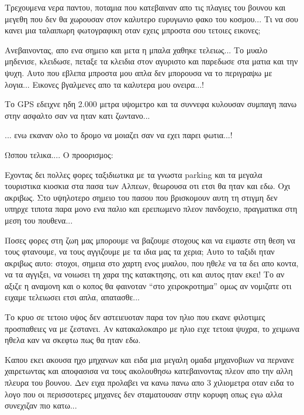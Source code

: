 
Τρεχουμενα νερα παντου, ποταμια που κατεβαιναν απο τις πλαγιες του βουνου και μεγεθη που δεν θα χωρουσαν στον καλυτερο ευρυγωνιο φακο του κοσμου... Τι να σου κανει μια ταλαιπωρη φωτογραφικη οταν εχεις μπροστα σου τετοιες εικονες;


Ανεβαινοντας, απο ενα σημειο και μετα η μπαλα χαθηκε τελειως... Το μυαλο μηδενισε, κλειδωσε, πεταξε τα κλειδια στον αγυριστο και παρεδωσε στα ματια και την ψυχη. 
Αυτο που εβλεπα μπροστα μου απλα δεν μπορουσα να το περιγραψω με λογια... 
Εικονες βγαλμενες απο τα καλυτερα μου ονειρα...!


Το GPS εδειχνε ηδη 2.000 μετρα υψομετρο και τα συννεφα κυλουσαν συμπαγη πανω στην ασφαλτο σαν να ηταν κατι ζωντανο...


... ενω εκαναν ολο το δρομο να μοιαζει σαν να εχει παρει φωτια...!


Ωσπου τελικα.... Ο προορισμος:


Εχοντας δει πολλες φορες ταξιδιωτικα με τα γνωστα parking και τα μεγαλα τουριστικα κιοσκια στα πασα των Αλπεων, θεωρουσα οτι ετσι θα ηταν και εδω. Οχι ακριβως. Στο υψηλοτερο σημειο του πασου που βρισκομουν αυτη τη στιγμη δεν υπηρχε τιποτα παρα μονο ενα παλιο και ερειπωμενο πλεον πανδοχειο, πραγματικα στη μεση του πουθενα... 


Ποσες φορες στη ζωη μας μπορουμε να βαζουμε στοχους και να ειμαστε στη θεση να τους φτανουμε, να τους αγγιζουμε με τα ιδια μας τα χερια; Αυτο το ταξιδι ηταν ακριβως αυτο: στοχοι, σημεια στο χαρτη ενος μυαλου, που ηθελε να τα δει απο κοντα, να τα αγγιξει, να νοιωσει τη χαρα της κατακτησης, οτι και αυτος ηταν εκει! 
Το αν αξιζε η αναμονη και ο κοπος θα φαινοταν ``στο χειροκροτημα'' ομως αν νομιζατε οτι ειχαμε τελειωσει ετσι απλα, απατασθε...


Το κρυο σε τετοιο υψος δεν αστειευοταν παρα τον ηλιο που εκανε φιλοτιμες προσπαθειες να με ζεστανει. Αν κατακαλοκαιρο με ηλιο ειχε τετοια ψυχρα, το χειμωνα ηθελα καν να σκεφτω πως θα ηταν εδω.

Καπου εκει ακουσα ηχο μηχανων και ειδα μια μεγαλη ομαδα μηχανοβιων να περνανε χαιρετωντας και αποφασισα να τους ακολουθησω κατεβαινοντας πλεον απο την αλλη πλευρα του βουνου. Δεν ειχα προλαβει να κανω πανω απο 3 χιλιομετρα οταν ειδα το λογο που οι περισσοτερες μηχανες δεν σταματουσαν στην κορυφη οπως εγω αλλα συνεχιζαν πιο κατω...

